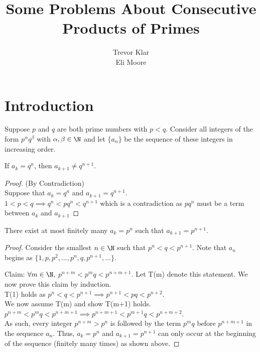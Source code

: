 \documentclass[letterpaper]{article}
\title{Some Problems About Consecutive Products of Primes}
\author{Trevor Klar \\ Eli Moore}
\begin{document}
\maketitle

\section{Introduction}
Suppose $p$ and $q$ are both prime numbers with $p < q$. Consider all integers of the form $p^\alpha q^\beta$ with $\alpha, \beta \in \N$ and let $\{a_n\}$ be the sequence of these integers in increasing order.
 
\begin{lemma}
    If $a_k = q^n$, then $a_{k+1} \neq q^{n+1}$.
\end{lemma}
\begin{proof} (By Contradiction) \\Suppose that $a_k = q^n$ and $a_{k+1} = q^{n+1}$.\\
$1 < p < q \implies q^n < pq^n < q^{n+1}$ which is a contradiction as $pq^n$ must be a term between $a_k$ and $a_{k+1}$
\end{proof}
\begin{lemma}
    There exist at most finitely many $a_k = p^n$ such that $a_{k+1} = p^{n+1}$.
\end{lemma}
\begin{proof} 
    Consider the smallest $n \in \N$ such that $p^n < q < p^{n+1}$. Note that $a_n$ begins as $\{1,p, p^2, ..., p^n, q, p^{n+1},...\}$.
    
    Claim: $\forall m \in \N,$ $p^{n+m} < p^mq < p^{n+m+1}$. Let T(m) denote this statement. We now prove this claim by induction.\\
    T(1) holds as $p^n < q < p^{n+1} \implies p^{n+1} < pq < p^{n+2}$.\\
    We now assume T(m) and show T(m+1) holds.\\
    $p^{n+m} < p^mq < p^{n+m+1} \implies p^{n+m+1} < p^{m+1}q < p^{n+m+2}$.\\
    As such, every integer $p^{n+m} > p^n$ is followed by the term $p^mq$ before $p^{n+m+1}$ in the sequence $a_n$. Thus, $a_k = p^n$ and $a_{k+1} = p^{n+1}$ can only occur at the beginning of the sequence (finitely many times) as shown above.
\end{proof}
\end{document}
